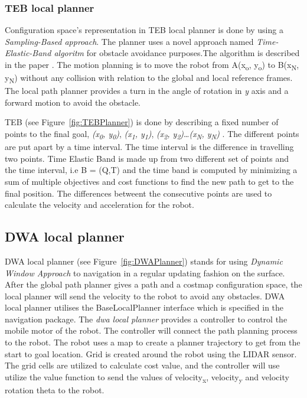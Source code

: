 \subsubsection{TEB local planner}
Configuration space's representation in TEB local planner is done by using a \textit{Sampling-Based approach}.
The planner uses a novel approach named \textit{Time-Elastic-Band algoritm} for obstacle avoidance purposes.The algorithm is described
in the paper \cite{KELLER20149822}. The motion planning is to move the robot from A(x\textsubscript{o}, y\textsubscript{o}) to B(x\textsubscript{N}, y\textsubscript{N}) without any collision with relation to the global and local reference frames.
The local path planner provides a turn in the angle of rotation in \textit{y} axis and a forward motion to avoid the obstacle. 

TEB (see Figure~\ref{fig:TEBPlanner}) is done by describing a fixed number of points to the final goal, \textit{(x\textsubscript{0}, y\textsubscript{0})}, \textit{(x\textsubscript{1}, y\textsubscript{1})}, \textit{(x\textsubscript{2}, y\textsubscript{2})}\dots \textit{(x\textsubscript{N}, y\textsubscript{N})}
 . The different points are put apart by a time interval. The time interval is the difference in travelling two points. Time Elastic Band is made up from 
two different set of points and the time interval, i.e B = (Q,T) and the time band is computed by minimizing a sum of multiple objectives and cost functions to find the new path to get to the final position. The differences betweent the consecutive points are used to calculate the velocity and acceleration for the robot.

\subsection{DWA local planner}
DWA local planner (see Figure~\ref{fig:DWAPlanner}) stands for using \textit{Dynamic Window Approach} to navigation in a regular updating fashion on the surface. After the global path planner gives a path and a costmap configuration space, the local planner will send the velocity to the robot to avoid any obstacles.
DWA local planner utilises the BaseLocalPlanner interface which is specified in the navigation package. The \textit{dwa local planner} provides a controller to control the mobile motor of the robot. The controller will connect the path planning process to the robot. The robot uses a map to create a planner trajectory to get from the start to goal location.
Grid is created around the robot using the LIDAR sensor. The grid cells are utilized to calculate cost value, and the controller will use utilize the value function to send the values of velocity\textsubscript{x}, velocity\textsubscript{y} and velocity rotation theta to the robot.

